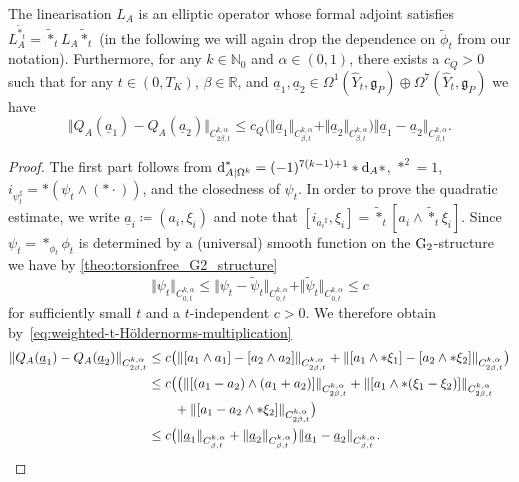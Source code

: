 \documentclass[11pt,a4paper]{scrartcl}
\newcommand*\diff{\mathop{}\!\textup{d}}
\newcommand{\VertWHt}[3]{\Vert_{C^{{#1},\alpha}_{{#2},t}{#3}}}
\newcommand{\G}{\textup{G}}
\numberwithin{equation}{section}
\theoremstyle{plain}
\theoremstyle{definition}
\theoremstyle{remark}
\begin{document}
\begin{proposition}\label{prop:DecompositionNonlinearMap}
The linearisation $L_A$ is an elliptic operator whose formal adjoint satisfies $L_A^{\tilde{*}_t} = \tilde{*}_t L_A \tilde{*}_t$ (in the following we will again drop the dependence on $\tilde{\phi}_t$ from our notation). Furthermore, for any $k\in \mathbb{N}_0$ and $\alpha\in(0,1)$, there exists a $c_Q>0$ such that for any $t\in(0,T_K)$, $\beta
\in \mathbb{R}$, and $\underline{a}_1,\underline{a}_2 \in \Omega^1(\hat{Y}_t,\mathfrak{g}_P)\oplus \Omega^7(\hat{Y}_t,\mathfrak{g}_P)$ we have \[ \Vert Q_A(\underline{a}_1) - Q_A(\underline{a}_2)\VertWHt{k}{2\beta}{} \leq c_Q \big( \Vert \underline{a}_1 \VertWHt{k}{\beta}{} + \Vert \underline{a}_2 \VertWHt{k}{\beta}{}\big) \Vert \underline{a}_1 - \underline{a}_2 \VertWHt{k}{\beta}{}. \] 
\end{proposition}
\begin{proof}
The first part follows from $\diff^{*}_{A\vert \Omega^k} = (-1)^{7(k-1)+1} *\diff_A*$, $*^2=1$, $i_{\psi_t^\sharp} = *( \psi_t \wedge (* \cdot))$, and the closedness of $\psi_t$. In order to prove the quadratic estimate, we write $\underline{a}_i \coloneqq (a_i,\xi_i)$ and note that $[i_{{a_i}^\sharp},\xi_i] = \tilde{*}_t [a_i \wedge \tilde{*}_t\xi_i]$. Since $\psi_t = *_{\phi_t} \phi_t$ is determined by a (universal) smooth function on the $\G_2$-structure we have by \autoref{theo:torsionfree_G2_structure} \[ \Vert \psi_t \VertWHt{k}{0}{} \leq \Vert \psi_t - \tilde{\psi}_t \VertWHt{k}{0}{} + \Vert \tilde{\psi}_t \VertWHt{k}{0}{} \leq c \] for sufficiently small $t$ and a $t$-independent $c>0$. We therefore obtain by~\eqref{eq:weighted-t-Höldernorms-multiplication}
\begin{align*}
\Vert Q_A(\underline{a}_1) - Q_A(\underline{a}_2)\VertWHt{k}{2\beta}{} & \leq c \big( \Vert [a_1\wedge a_1]-[a_2 \wedge a_2] \VertWHt{k}{2\beta}{}  + \Vert [a_1\wedge*\xi_1]-[a_2\wedge*\xi_2] \VertWHt{k}{2\beta}{} \big) \\
& \leq c \big(\big( \Vert [(a_1-a_2)\wedge (a_1+a_2)] \VertWHt{k}{2\beta}{} +\Vert [a_1\wedge*(\xi_1-\xi_2)]\VertWHt{k}{2\beta}{} \\
& \qquad  +\Vert [a_1-a_2\wedge*\xi_2]\VertWHt{k}{2\beta}{} \big) \\
& \leq c \big( \Vert \underline{a}_1 \VertWHt{k}{\beta}{} + \Vert \underline{a}_2 \VertWHt{k}{\beta}{}\big) \Vert \underline{a}_1 - \underline{a}_2 \VertWHt{k}{\beta}{}.  \qedhere
\end{align*}
\end{proof}
\end{document}
